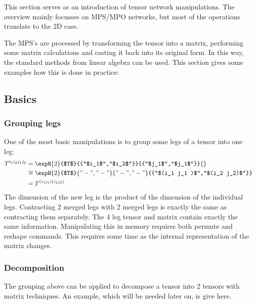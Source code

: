 This section serves as an introduction of tensor network manipulations. The overview mainly focusses on MPS/MPO networks, but most of the operations translate to the 2D case.

The MPS's are processed by transforming the tensor into a matrix, performing some matrix calculations and casting it back into its original form. In this way, the standard methods from linear algebra can be used. This section gives some examples how this is done in practice:

\subsection{Basics}

\subsubsection{Grouping legs}
One of the most basic manipulations is to group some legs of a tensor into one leg:
\begin{equation}
    \begin{split}
        T^{i_1 i_2 j_1 j_2} &=  \expH{2}{$T$}{{"$i_1$","$i_2$"}}{{"$j_1$","$j_1$"}}{} \\
        & \cong \expH{2}{$T$}{{"-","-"}}{{"-","-"}}{{"$(i_1 j_1 )$","$(i_2 j_2)$"}} \\
        &= T^{ (i_1 j_1 ) (i_2 j_2) } \\
    \end{split}
\end{equation}
The dimension of the new leg is the product of the dimension of the individual legs. Contracting 2 merged legs with 2 merged legs is exactly the same as contracting them separately. The 4 leg tensor and matrix contain exactly the same information.
Manipulating this in memory requires both permute and reshape commands. This requires some time as the internal representation of the matrix changes.

\subsubsection{Decomposition} \label{decompMPO}

The grouping above can be applied to decompose a tensor into 2 tensors with matrix techniques. An example, which will be needed later on, is give here.

\def \figone {\expH{2}{$O^{u v,v w}$}{{"$i_1$","$i_2$"}}{{"$j_1$","$j_1$"}}{{"u","w"}}}

